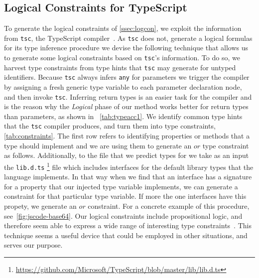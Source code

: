 \documentclass[acmsmall,nonacm]{acmart}\settopmatter{printfolios=true,printccs=false,printacmref=false}
\begin{document}
\subsection{Logical Constraints for TypeScript}\label{ssec:logprodts}
To generate the logical constraints of \cref{ssec:logcon}, we exploit the information from \lstinline+tsc+, the TypeScript compiler~\cite{typescript}. 
As \lstinline+tsc+ does not, generate a logical formulas 
for its type inference procedure we devise the following technique that allows us to generate some logical constraints based on \lstinline+tsc+'s information. To do so, we harvest type constraints from type hints that \lstinline+tsc+ may generate
for untyped identifiers. Because \lstinline+tsc+ always infers \texttt{\small{any}} for parameters we trigger
the compiler by assigning a fresh generic type variable to each parameter declaration node, and then invoke \lstinline+tsc+. 
Inferring return types is an easier task for the compiler and is the reason why the \textit{Logical} phase of our method works better for return types than parameters, as shown in ~\cref{tab:typeacc1}. 
We identify common type hints that the \lstinline+tsc+ compiler produces, and turn them into type constraints, \cref{tab:constraints}. The first row 
refers to identifying properties or methods that a type should implement
and we are using them to generate an $\mathrel{or}$ type constraint as follows. Additionally, to the file that we 
predict types for we take as an input the \lstinline{lib.d.ts} \footnote{\url{https://github.com/Microsoft/TypeScript/blob/master/lib/lib.d.ts}} file which includes interfaces for the default library types that the language implements. In that way when we find that an interface has a signature for a property that our injected type variable implements, we can generate a constraint for that particular type variable. If more the one interfaces have this propety, we generate an $\mathrel{or}$ constraint.
For a concrete example of this procedure, 
see~\cref{fig:jscode-base64}.
Our logical constraints include propositional logic, and therefore seem able to express a wide range of interesting type constraints~\citep{odersky99,pottier05}.
%
This technique seems a useful device that could be employed in other situations, and serves our purpose.
\end{document}
